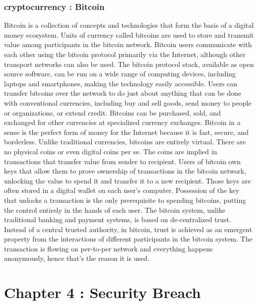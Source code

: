 \documentclass[twosided,a4,10pt]{article}
\begin{document}
\begin{multicols}{2}
\subsubsection{cryptocurrency : Bitcoin}

Bitcoin is a collection of concepts and technologies that form the basis of a digital money ecosystem. Units of currency called bitcoins are used to store and transmit value among participants in the bitcoin network. Bitcoin users communicate with each other using the bitcoin protocol primarily via the Internet, although other transport networks can also be used. The bitcoin protocol stack, available as open source software, can be run on a wide range of computing devices, including laptops and smartphones, making the technology easily accessible. \newline
Users can transfer bitcoins over the network to do just about anything that can be done with conventional currencies, including buy and sell goods, send money to people or organizations, or extend credit. Bitcoins can be purchased, sold, and exchanged for other currencies at specialized currency exchanges. Bitcoin in a sense is the perfect form of money for the Internet because it is fast, secure, and borderless.\newline
\newline
Unlike traditional currencies, bitcoins are entirely virtual. There are no physical coins or even digital coins per se. The coins are implied in transactions that transfer value from sender to recipient. Users of bitcoin own keys that allow them to prove ownership of transactions in the bitcoin network, unlocking the value to spend it and transfer it to a new recipient. Those keys are often stored in a digital wallet on each user’s computer. Possession of the key that unlocks a transaction is the only prerequisite to spending bitcoins, putting the control entirely in the hands of each user.\newline
The bitcoin system, unlike traditional banking and payment systems, is based on de-centralized trust. Instead of a central trusted authority, in bitcoin, trust is achieved as an emergent property from the interactions of different participants in the bitcoin system. The transaction is flowing on per-to-per network and everything happens anonymously, hence that's the reason it is used.
 
\section{Chapter 4 : Security Breach}


\end{multicols}
\end{document}
